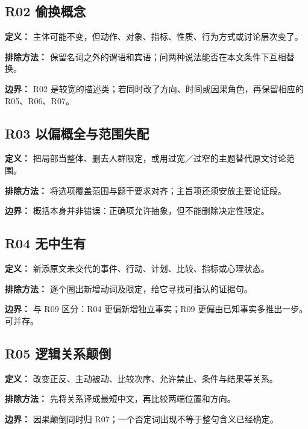 \documentclass[11pt,a4paper]{article}
\begin{document}
\subsection{R02 偷换概念}\label{cat-R02}
\noindent\textbf{定义：} 主体可能不变，但动作、对象、指标、性质、行为方式或讨论层次变了。\par\smallskip
\noindent\textbf{排除方法：} 保留名词之外的谓语和宾语；问两种说法能否在本文条件下互相替换。\par\smallskip
\noindent\textbf{边界：} R02 是较宽的描述类；若同时改了方向、时间或因果角色，再保留相应的 R05、R06、R07。\par\smallskip
{}
\subsection{R03 以偏概全与范围失配}\label{cat-R03}
\noindent\textbf{定义：} 把局部当整体、删去人群限定，或用过宽／过窄的主题替代原文讨论范围。\par\smallskip
\noindent\textbf{排除方法：} 将选项覆盖范围与题干要求对齐；主旨项还须安放主要论证段。\par\smallskip
\noindent\textbf{边界：} 概括本身并非错误：正确项允许抽象，但不能删除决定性限定。\par\smallskip
{}
\subsection{R04 无中生有}\label{cat-R04}
\noindent\textbf{定义：} 新添原文未交代的事件、行动、计划、比较、指标或心理状态。\par\smallskip
\noindent\textbf{排除方法：} 逐个圈出新增动词及限定，给它寻找可指认的证据句。\par\smallskip
\noindent\textbf{边界：} 与 R09 区分：R04 更偏新增独立事实；R09 更偏由已知事实多推出一步。可并存。\par\smallskip
{}
\subsection{R05 逻辑关系颠倒}\label{cat-R05}
\noindent\textbf{定义：} 改变正反、主动被动、比较次序、允许禁止、条件与结果等关系。\par\smallskip
\noindent\textbf{排除方法：} 先将关系译成最短中文，再比较两端位置和方向。\par\smallskip
\noindent\textbf{边界：} 因果颠倒同时归 R07；一个否定词出现不等于整句含义已经确定。\par\smallskip
{}
\end{document}
